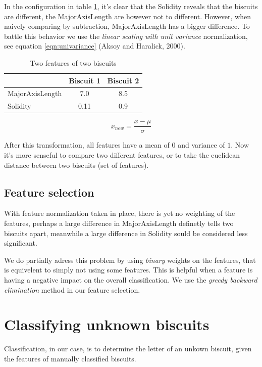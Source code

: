 \documentclass[a4paper,11pt]{article}
\begin{document}
In the configuration in table \ref{tab:features}, it's clear that the Solidity reveals that the biscuits
are different, the MajorAxisLength are however not to different.
However, when naively comparing by subtraction, MajorAxisLength has a bigger difference.
To battle this behavior we use the \emph{linear scaling with unit variance} normalization, see equation \ref{eqn:univariance} (Aksoy and Haralick, 2000).

\begin{table}[h!b!p!]
\caption{Two features of two biscuits}
\begin{center}
    \begin{tabular}{ l | c | c | }
                    & Biscuit 1 & Biscuit 2 \\ \hline
    MajorAxisLength & 7.0       & 8.5       \\ \hline
    Solidity        & 0.11      & 0.9       \\ \hline
    \end{tabular}
\end{center}
\label{tab:features}
\end{table}

\begin{equation}
x_{new} = \frac{x - \mu}{\sigma}
\label{eqn:univariance}
\end{equation}

After this transformation, all features have a mean of $0$ and variance of $1$.
Now it's more senseful to compare two different features, or to take the euclidean distance between two biscuits (set of features).
\subsection{Feature selection}
With feature normalization taken in place, there is yet no weighting of the features,
perhaps a large difference in MajorAxisLength definetly tells two biscuits apart,
meanwhile a large difference in Solidity sould be considered less significant.

We do partially adress this problem by using \emph{binary} weights on the features, 
that is equivelent to simply not using some features.
This is helpful when a feature is having a negative impact on the overall classification.
We use the \emph{greedy backward elimination} method in our feature selection.
\section{Classifying unknown biscuits}
Classification, in our case, is to determine the letter of an unkown biscuit, given the features of manually classified biscuits.
\end{document}

